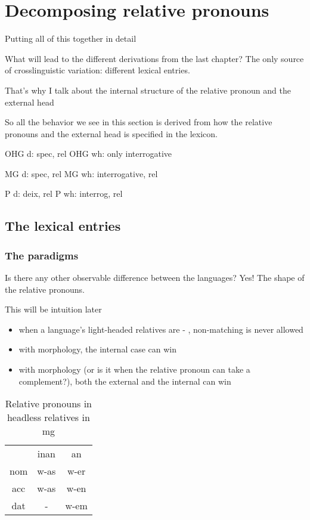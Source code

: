 
\chapter{Decomposing relative pronouns}\label{ch:decomposing-relative-pronouns}

Putting all of this together in detail

What will lead to the different derivations from the last chapter? The only source of crosslinguistic variation: different lexical entries.

That's why I talk about the internal structure of the relative pronoun and the external head

So all the behavior we see in this section is derived from how the relative pronouns and the external head is specified in the lexicon.

OHG d: spec, rel
OHG wh: only interrogative

MG d: spec, rel
MG wh: interrogative, rel

P d: deix, rel
P wh: interrog, rel


\section{The lexical entries}


\subsection{The paradigms}

Is there any other observable difference between the languages? Yes! The shape of the relative pronouns.

This will be intuition later

\begin{itemize}
  \item when a language's light-headed relatives are  - , non-matching is never allowed
  \item with  morphology, the internal case can win
  \item with  morphology (or is it when the relative pronoun can take a complement?), both the external and the internal can win
\end{itemize}


\begin{table}[H]
 \center
 \caption {Relative pronouns in headless relatives in \ac{mg}}
  \begin{tabular}{ccc}
  \toprule
       & \ac{inan} & \ac{an} \\
        \cmidrule{2-3}
    \ac{nom}  & w-as     & w-er    \\
    \ac{acc}  & w-as     & w-en   \\
    \ac{dat}  & -      & w-em    \\
  \bottomrule
  \end{tabular}
\end{table}

